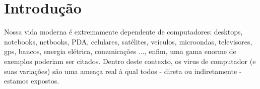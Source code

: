 \chapter{Introdução}

Nossa vida moderna é extremamente dependente de computadores: desktops, notebooks, netbooks, PDA, celulares, satélites, veículos, microondas, televisores, gps, bancos, energia elétrica, comunicações ..., enfim, uma gama enorme de exemplos poderiam ser citados. Dentro deste contexto, os virus de computador (e suas variações) são uma ameaça real à qual todos - direta ou indiretamente - estamos expostos.


